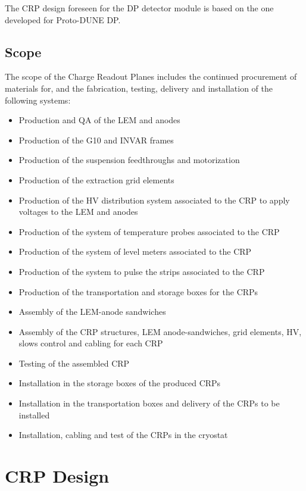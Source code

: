 The CRP design foreseen for the DP detector module is based on the one developed for Proto-DUNE DP.

\subsection{Scope}
\label{sec:fddp-crp-scope}

The scope of the Charge Readout Planes includes the continued procurement of materials for, and the fabrication, testing, delivery and installation of the following systems: 

\begin{itemize}
\item  Production and QA of the LEM and anodes
\item  Production of the G10 and INVAR frames
\item Production of the suspension feedthroughs and motorization
\item Production of the extraction grid elements
\item Production of the HV distribution system associated to the CRP to apply voltages to the LEM and anodes
\item Production of the system of temperature probes associated to the CRP
\item Production of the system of level meters associated to the CRP
\item Production of the system to pulse the strips associated to the CRP
\item Production of the transportation and storage boxes for the CRPs
\item Assembly of the LEM-anode sandwiches
\item Assembly of the CRP structures, LEM anode-sandwiches, grid elements, HV, slows control and cabling for each CRP
\item Testing of the assembled CRP
\item Installation in the storage boxes of the produced CRPs
\item Installation in the transportation boxes and delivery of the CRPs to be installed
\item Installation, cabling and test of the CRPs in the cryostat
\end{itemize}



\section{CRP Design}
\label{sec:fddp-crp-design}

